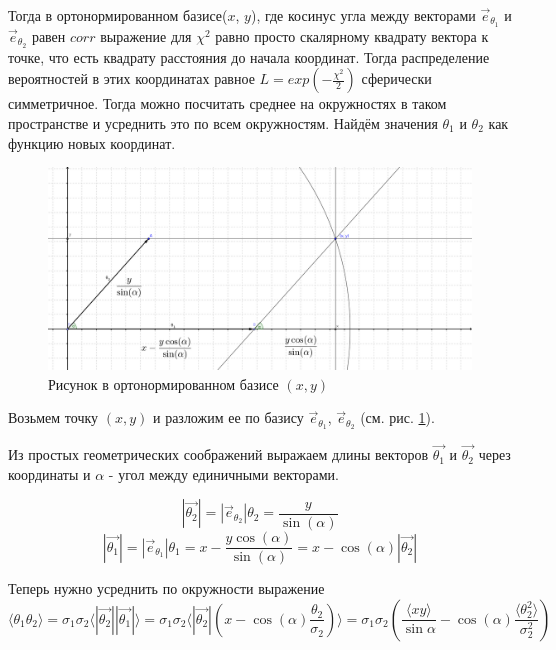 \documentclass[a4paper,12pt]{article}
\begin{document}
Тогда в ортонормированном базисе($x$, $y$), где косинус угла между векторами $\vec{e}_{\theta_1}$ и $\vec{e}_{\theta_2}$ равен $corr$
выражение для $\chi^2$ равно просто скалярному квадрату вектора к точке, что есть квадрату
расстояния до начала координат. Тогда распределение вероятностей в этих координатах
равное $L = exp(-\frac{\chi^2}{2})$ сферически симметричное. Тогда можно посчитать среднее на
окружностях в таком пространстве и усреднить это по всем окружностям.
Найдём значения $\theta_1$ и $\theta_2$ как функцию новых координат.

\begin{figure}[H]
\centering
\includegraphics[width=1\textwidth]{geogebra_graph_3.png}
\caption{Рисунок в ортонормированном базисе $(x, y)$}
\label{fig:1}
\end{figure}

Возьмем точку $(x, y)$ и разложим ее по базису $\vec{e}_{\theta_1}$, $\vec{e}_{\theta_2}$ (см. рис. \ref{fig:1}).

Из простых геометрических соображений выражаем длины векторов $\vec{\theta_1}$ и $\vec{\theta_2}$ через
координаты и $\alpha$ - угол между единичными векторами.

\[ \left\lvert  \vec{\theta_2} \right\rvert = \left\lvert \vec{e}_{\theta_2} \right\rvert \theta_2 = \frac{y}{\sin(\alpha)} \]
\[ \left\lvert  \vec{\theta_1} \right\rvert = \left\lvert \vec{e}_{\theta_1} \right\rvert \theta_1 = x - \frac{y\cos(\alpha)}{\sin(\alpha)}
= x - \cos(\alpha)\left\lvert  \vec{\theta_2} \right\rvert \]

Теперь нужно усреднить по окружности выражение
\[ \langle \theta_1\theta_2\rangle =
\sigma_1\sigma_2 \langle \left\lvert  \vec{\theta_2} \right\rvert
\left\lvert  \vec{\theta_1} \right\rvert\rangle
= \sigma_1\sigma_2 \langle \left\lvert  \vec{\theta_2} \right\rvert
\left(  x - \cos(\alpha) \frac{\theta_2}{\sigma_2}  \right)\rangle
= \sigma_1\sigma_2 \left(
\frac{\langle xy\rangle}{\sin{\alpha}}  -
\cos(\alpha) \frac{\langle\theta_2^2\rangle }{\sigma_2^2}  \right) \]
\end{document}
